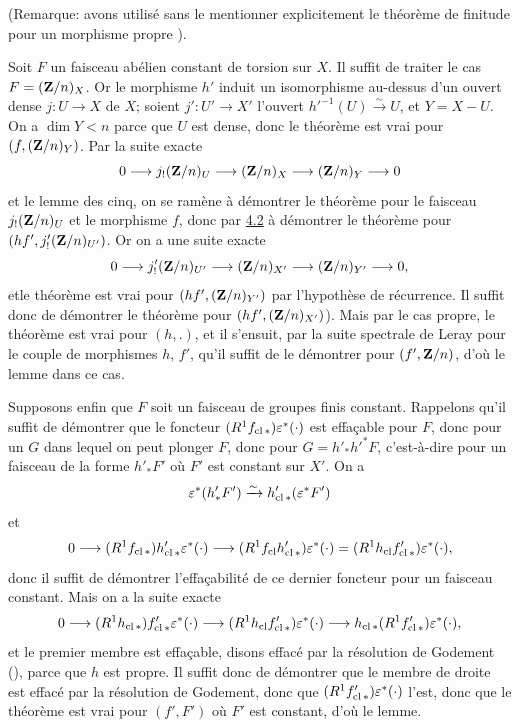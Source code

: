 \documentclass[10pt]{../fichiers-configuration-latex/smfart}
\begin{document}
\noindent
(Remarque:  avons utilisé sans le mentionner explicitement le
théorème de finitude pour un morphisme propre ).

Soit $F$ un faisceau abélien constant de torsion sur $X$. Il suffit de
traiter le cas $F=(\mathbf{Z}/n)_X$. Or le morphisme $h'$ induit un
isomorphisme au-dessus d'un ouvert dense $j:U\rightarrow X$ de $X$;
soient $j':U'\rightarrow X'$ l'ouvert
${h'}^{-1}(U)\xrightarrow{\sim}U$, et $Y=X-U$. On a $\dim Y<n$ parce
que $U$ est dense, donc le théorème est vrai pour
$(f,(\mathbf{Z}/n)_Y)$. Par la suite exacte
$$
0\longrightarrow j_{!}(\mathbf{Z}/n)_U\longrightarrow
(\mathbf{Z}/n)_X\longrightarrow (\mathbf{Z}/n)_Y\longrightarrow 0
$$
et le lemme des cinq, on se ramène à démontrer le théorème pour le
faisceau $j_{!}(\mathbf{Z}/n)_U$ et le morphisme $f$, donc par \hyperref[XVI.lem4.2]{4.2} à
démontrer le théorème pour $(hf', {j'_!}(\mathbf{Z}/n)_{U'})$. Or on
a une suite exacte
$$
0\longrightarrow {j'_!}(\mathbf{Z}/n)_{U'}\longrightarrow
(\mathbf{Z}/n)_{X'}\longrightarrow (\mathbf{Z}/n)_{Y'}\longrightarrow
0{},
$$
et\pageoriginale le théorème est vrai pour $(hf',(\mathbf{Z}/n)_{Y'})$
par l'hypothèse de récurrence. Il suffit donc de démontrer le théorème
pour $(hf',(\mathbf{Z}/n)_{X'})$). Mais par le cas propre, le théorème
est vrai pour $(h,.)$, et il s'ensuit, par la suite spectrale de Leray
pour le couple de morphismes $h$, $f'$, qu'il suffit de le démontrer
pour $(f',\mathbf{Z}/n)$, d'où le lemme dans ce cas.

Supposons enfin que $F$ soit un faisceau de groupes finis
constant. Rappelons qu'il suffit de démontrer que le foncteur
$(R^{1}f_{\operatorname{cl} \ast})\varepsilon^{\ast}(\cdot)$ est effaçable pour $F$,
donc pour un $G$ dans lequel on peut plonger $F$, donc pour
$G={h'_\ast}{h'}^{\ast}F$, c'est-à-dire pour un faisceau de la forme
${h'_\ast}F'$ où $F'$ est constant sur $X'$. On a
$$
\varepsilon^{\ast}({h'_\ast}F')\xrightarrow{\sim}h'_{\operatorname{cl} \ast}(\varepsilon^{\ast}F')
$$
et
$$
0\longrightarrow
(R^{1}f_{\operatorname{cl}\ast})h'_{\operatorname{cl}\ast}\varepsilon^{\ast}(\cdot)\longrightarrow
(R^{1}f_{\operatorname{cl}}h'_{\operatorname{cl}\ast})\varepsilon^{\ast}(\cdot)=(R^{1}h_{\operatorname{cl}}f'_{\operatorname{cl}\ast})\varepsilon^{\ast}(\cdot){},
$$
donc il suffit de démontrer l'effaçabilité de ce dernier foncteur
pour un faisceau constant. Mais on a la suite exacte
$$
0\longrightarrow (R^{1}h_{\operatorname{cl} \ast})f'_{\operatorname{cl}
\ast}\varepsilon^{\ast}(\cdot)\longrightarrow (R^{1}h_{\operatorname{cl}}f'_{\operatorname{cl}
\ast})\varepsilon^{\ast}(\cdot)\longrightarrow
h_{\operatorname{cl}\ast}(R^{1}f'_{\operatorname{cl}\ast})\varepsilon^{\ast}(\cdot){},
$$
et le premier membre est effaçable, disons effacé par la résolution
de Godement (), parce que $h$ est propre. Il suffit donc de
démontrer que le membre de droite est effacé par la résolution de
Godement, donc que $(R^{1}f'_{\operatorname{cl}\ast})\varepsilon^{\ast}(\cdot)$ l'est,
donc que le théorème est vrai pour $(f',F')$ où $F'$ est constant,
d'où le lemme.
\end{document}
